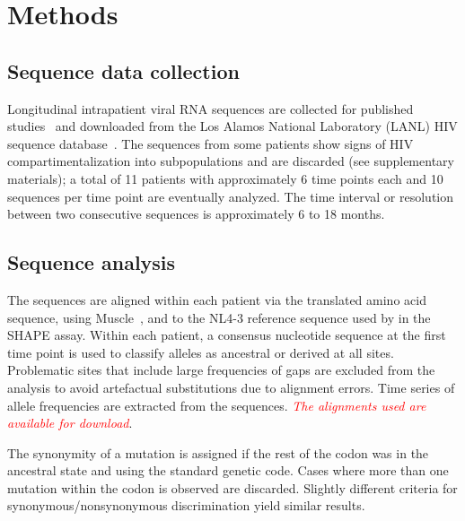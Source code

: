 \documentclass[rmp, twocolumn]{revtex4}
\newcommand{\comment}[1]{\textit{\textcolor{red}{#1}}}
\begin{document}
\section{Methods}
\subsection{Sequence data collection}
Longitudinal intrapatient viral RNA sequences are collected for published
studies~\citep{shankarappa_consistent_1999, liu_selection_2006,
bunnik_autologous_2008} and downloaded from the Los Alamos National Laboratory
(LANL) HIV sequence database~\citep{LANL2012}. The sequences from some patients
show signs of HIV compartimentalization into subpopulations and are
discarded (see supplementary materials);
a total of 11 patients with approximately 6 time points each and 10
sequences per time point are eventually analyzed. The time interval or
resolution between two consecutive sequences is approximately 6 to 18 months.

\subsection{Sequence analysis}
The sequences are aligned within each patient
via the translated amino acid sequence, using
Muscle~\citep{edgar_muscle:_2004}, and to the NL4-3 reference sequence used
by \citet{watts_architecture_2009} in the SHAPE assay. Within each patient, a
consensus nucleotide sequence at the first time point is used to classify
alleles as ancestral or derived at all sites. Problematic sites that include large frequencies of gaps
are excluded from the analysis to avoid artefactual substitutions due to
alignment errors. Time series of allele frequencies are extracted from the
sequences. \comment{The alignments used are available for download}. 

The synonymity of a mutation is assigned if the rest of the codon was
in the ancestral state and using the standard genetic code. Cases where more
than one mutation within the codon is observed are discarded. Slightly
different criteria for synonymous/nonsynonymous discrimination yield similar
results.
\end{document}
